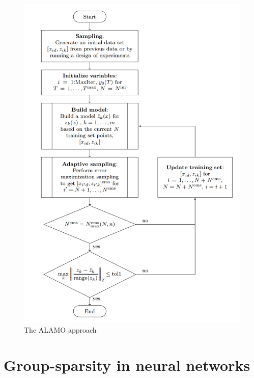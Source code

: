 \documentclass[a4paper,12pt]{article}
\begin{document}
\begin{figure}[H]
 \centering
 \includegraphics[scale=0.4]{flowchart-alamo.png}
 \caption{The ALAMO approach}
  \label{fig:ALAMO Flowchart}
\end{figure}

\newpage

\section{Group-sparsity in neural networks}
\end{document}
